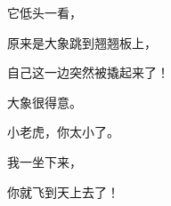 \newpage
{} %
\vspace*{15pt}
{\linespread{1.5}\fontsize{18}{18}\selectfont
\par
它低头一看，\par
原来是大象跳到翘翘板上，\par
自己这一边突然被撬起来了！\par
大象很得意。\par
小老虎，你太小了。\par
我一坐下来，\par
你就飞到天上去了！\par
\par
\par}



